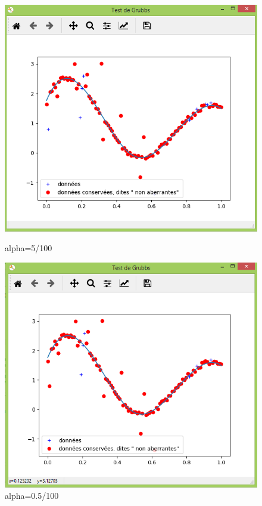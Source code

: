 \documentclass[11pt]{report}
\begin{document}
 \begin{figure}[!htb] %
\includegraphics[width=\linewidth]{grun.PNG} %
\caption{alpha=5/100} %
\label{alpha1995} %
\endminipage
{}%
\includegraphics[width=\linewidth]{gru005.PNG}  
\caption{alpha=0.5/100}
\label{alpha_0995}

\end{figure}
\end{document}
